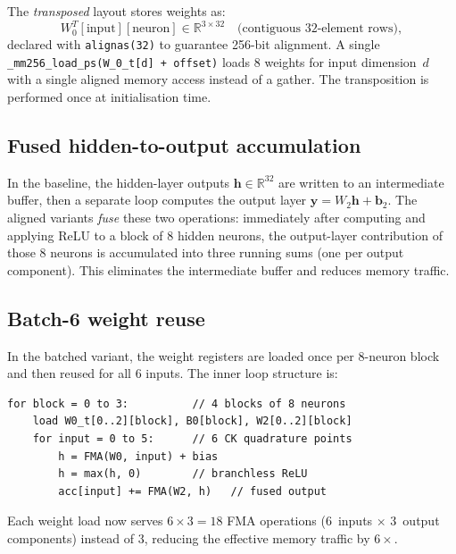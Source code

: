 \documentclass[11pt,a4paper]{article}
\begin{document}
The \emph{transposed} layout stores weights as:
\begin{equation}
    W_0^T[\text{input}][\text{neuron}] \in \mathbb{R}^{3 \times 32}
    \quad\text{(contiguous 32-element rows)},
\end{equation}
declared with \texttt{alignas(32)} to guarantee 256-bit alignment.
A single \texttt{\_mm256\_load\_ps(W\_0\_t[d] + offset)} loads 8
weights for input dimension~$d$ with a single aligned memory access
instead of a gather.  The transposition is performed once at
initialisation time.


\subsection{Fused hidden-to-output accumulation}
\label{sec:fused}

In the baseline, the hidden-layer outputs $\mathbf{h} \in
\mathbb{R}^{32}$ are written to an intermediate buffer, then a
separate loop computes the output layer
$\mathbf{y} = W_2 \mathbf{h} + \mathbf{b}_2$.  The aligned variants
\emph{fuse} these two operations: immediately after computing and
applying ReLU to a block of 8 hidden neurons, the output-layer
contribution of those 8 neurons is accumulated into three running sums
(one per output component).  This eliminates the intermediate buffer
and reduces memory traffic.


\subsection{Batch-6 weight reuse}
\label{sec:batch6}

In the batched variant, the weight registers are loaded once per 8-neuron
block and then reused for all 6 inputs.  The inner loop structure is:

\begin{lstlisting}[caption={Pseudocode for the AVX2 aligned batch-6 inner loop.}]
for block = 0 to 3:          // 4 blocks of 8 neurons
    load W0_t[0..2][block], B0[block], W2[0..2][block]
    for input = 0 to 5:      // 6 CK quadrature points
        h = FMA(W0, input) + bias
        h = max(h, 0)        // branchless ReLU
        acc[input] += FMA(W2, h)   // fused output
\end{lstlisting}

Each weight load now serves $6 \times 3 = 18$ FMA operations
(6~inputs $\times$ 3~output components) instead of $3$, reducing
the effective memory traffic by $6\times$.
\end{document}

